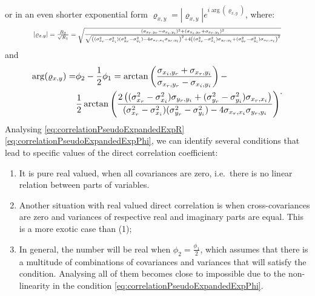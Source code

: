 \documentclass[
]{book}
\providecommand{\tightlist}{%
  \setlength{\itemsep}{0pt}\setlength{\parskip}{0pt}}
\begin{document}
or in an even shorter exponential form \({\varrho}_{x,y} = |{\varrho}_{x,y}| e ^{i \arg({\varrho}_{x,y})}\), where:
\begin{equation}
    \resizebox{0.85\textwidth}{!}{$
    |{\varrho}_{x,y}|= \frac{R_2}{\sqrt{R_1}} = \sqrt{\frac{(\sigma_{x_r, y_r} - \sigma_{x_i, y_i})^2 +  (\sigma_{x_i, y_r} + \sigma_{x_r, y_i})^2}{\sqrt{\left((\sigma_{x_r}^2 - \sigma_{x_i}^2)(\sigma_{y_r}^2 - \sigma_{y_i}^2) - 4 \sigma_{x_r,x_i} \sigma_{y_r,y_i} \right)^2+ 4 \left( (\sigma_{x_r}^2 - \sigma_{x_i}^2) \sigma_{y_r,y_i} + (\sigma_{y_r}^2 - \sigma_{y_i}^2) \sigma_{x_r,x_i} \right)^2}}}$}
    \label{eq:correlationPseudoExpandedExpR}
\end{equation}
and
\begin{equation}
    \resizebox{0.85\textwidth}{!}{$
    \begin{aligned}
    \arg({\varrho}_{x,y}) = & \phi_2 - \frac{1}{2} \phi_1 = \arctan \left( \frac{\sigma_{x_i, y_r} + \sigma_{x_r, y_i}}{\sigma_{x_r, y_r} - \sigma_{x_i, y_i}} \right) - \\
    & \frac{1}{2}\arctan \left(\frac{2 \left( (\sigma_{x_r}^2 - \sigma_{x_i}^2) \sigma_{y_r,y_i} + (\sigma_{y_r}^2 - \sigma_{y_i}^2) \sigma_{x_r,x_i} \right)}{(\sigma_{x_r}^2 - \sigma_{x_i}^2)(\sigma_{y_r}^2 - \sigma_{y_i}^2) - 4 \sigma_{x_r,x_i} \sigma_{y_r,y_i}}\right)
    \end{aligned}$}.
    \label{eq:correlationPseudoExpandedExpPhi}
\end{equation}
Analysing \eqref{eq:correlationPseudoExpandedExpR} \eqref{eq:correlationPseudoExpandedExpPhi}, we can identify several conditions that lead to specific values of the direct correlation coefficient:

\begin{enumerate}
\def\labelenumi{\arabic{enumi}.}
\tightlist
\item
  It is pure real valued, when all covariances are zero, i.e.~there is no linear relation between parts of variables.
\item
  Another situation with real valued direct correlation is when cross-covariances are zero and variances of respective real and imaginary parts are equal. This is a more exotic case than (1);
\item
  In general, the number will be real when \(\phi_2 = \frac{\phi_1}{2}\), which assumes that there is a multitude of combinations of covariances and variances that will satisfy the condition. Analysing all of them becomes close to impossible due to the non-linearity in the condition \eqref{eq:correlationPseudoExpandedExpPhi}.
\end{enumerate}
\end{document}
